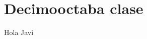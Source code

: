 \documentclass[../main.tex]{subfiles}
\begin{document}
\section{Decimooctaba clase}
Hola Javi
\end{document}
